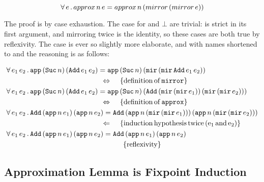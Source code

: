 \begin{equation*}
\forall \, e \, . \,  approx \, n \, e = approx \, n \, (mirror \, (mirror \, e))
\end{equation*}

The proof is by case exhaustion. The case for  and $\bot$
are trivial:  is strict in its first argument, and
mirroring  twice is the identity, so these cases are both
true by reflexivity. The  case is ever so slightly more
elaborate, and with names shortened to  and  the
reasoning is as follows:

\newcommand{\Adds}[2]{\hs{Add} \, #1 e_1 #2 \, #1 e_2 #2}
\newcommand{\Approxn}[0]{\hs{app} \, n \,}
\newcommand{\ApproxSucn}[0]{\hs{app} \, (\hs{Suc} \, n) \,}
\newcommand{\mirmir}[0]{\hs{mir} \, (\hs{mir} \, }
\begin{align*}
\faa{e_1}{e_2}&  \ApproxSucn (\Adds{}{})  = \ApproxSucn (\mirmir \Adds{}{} ))                                                                   \\
                                                                                 \desclra{\defof{\hs{mirror}}}                                   \\
\faa{e_1}{e_2}&  \ApproxSucn (\Adds{}{})  = \ApproxSucn (\Adds{(\mirmir}{))})                                                                    \\
                                                                                \desclra{\defof{\hs{approx}}}                                    \\
\faa{e_1}{e_2}&  \Adds{(\Approxn}{)}      = \Adds{(\Approxn(\mirmir}{)))}                                                                        \\
                                                                                \descla{induction \, hypothesis \, twice \, (e_1 \, and \, e_2)} \\
\faa{e_1}{e_2}&  \Adds{(\Approxn}{)}      = \Adds{(\Approxn}{)}                                                                                  \\
                                                                                \desca{reflexivity}                                              \\
\end{align*}

\subsection{Approximation Lemma is Fixpoint Induction}


